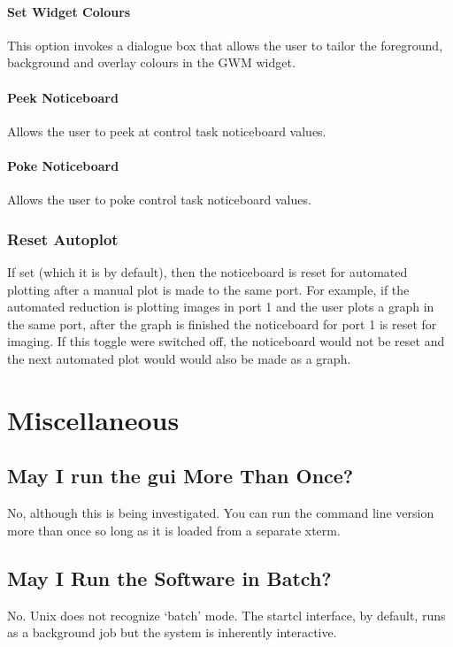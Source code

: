 \documentclass[a4paper]{book}
\newcommand{\stardocinitials}  {SUN}
\newcommand{\stardocnumber}    {27.5}
\newcommand{\stardocname}{\stardocinitials /\stardocnumber}
\renewcommand{\_}{{\tt\char'137}}
\begin{document}
\subsubsection{Set Widget Colours}
This option invokes a dialogue box that allows the user to tailor the foreground,
background and overlay colours in the GWM widget.

\subsubsection{Peek Noticeboard}
Allows the user to peek at control task noticeboard values.

\subsubsection{Poke Noticeboard}
Allows the user to poke control task noticeboard values.

\subsection{Reset Autoplot}
If set (which it is by default), then the noticeboard is reset for automated plotting
after a manual plot is made to the same port. For example, if the automated reduction
is plotting images in port 1 and the user plots a graph in the same port, after the
graph is finished the noticeboard for port 1 is reset for imaging. If this toggle were
switched off, the noticeboard would not be reset and the next automated plot would would
also be made as a graph.

\chapter{Miscellaneous}
\markboth{Miscellaneous}{\stardocname}
\section{May I run the {\sc gui} More Than Once?}
No, although this is being investigated. You can run the command line version more than
once so long as it is loaded from a separate xterm.

\section{May I Run the Software in Batch?}
No. Unix does not recognize `batch' mode. The {\sc startcl} interface, by default,
runs as a background job but the system is inherently interactive.
\end{document}
